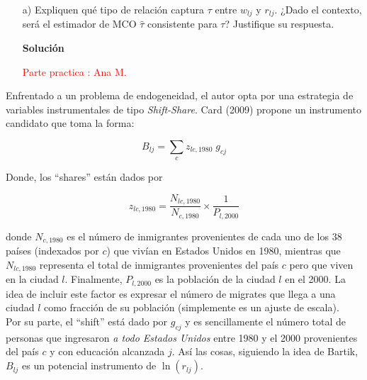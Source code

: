 \documentclass[a4paper, answers, addpoints, 11pt]{exam}
\newenvironment{solucion}{%
  \begin{mdframed}[
    backgroundcolor=blue!5,    %
    linecolor=blue!50,          %
    linewidth=2pt,              %
    leftmargin=10pt,            %
    rightmargin=8pt,           %
    topline=true,              %
    bottomline=true,            %
    roundcorner=10pt,           %
    innerleftmargin=10pt,       %
    innerrightmargin=10pt,      %
    innerbottommargin=10pt,     %
    innertopmargin=10pt         %
  ]%
  \begin{tcolorbox}[colframe=blue!50!black, colback=blue!50, coltitle=white, sharp corners=all, boxrule=1mm, width=\textwidth, halign=left, valign=center, top=0mm, bottom=0mm, left=0mm, right=0mm] \textbf{Solución} \end{tcolorbox} }{\end{mdframed}}
\begin{document}
 
\begin{itemize}

   

    \item[a)] Expliquen qué tipo de relación captura $\tau$ entre $w_{lj}$ y $r_{lj}$. ¿Dado el contexto, será el estimador de MCO $\hat{\tau}$ consistente para $\tau$? Justifique su respuesta.\\
    \begin{solucion}
    \textcolor{red}{Parte practica : Ana M.}
\end{solucion}
\end{itemize}   

Enfrentado a un problema de endogeneidad, el autor opta por una estrategia de variables instrumentales de tipo \textit{Shift-Share}. Card (2009) propone un instrumento candidato que toma la forma:

$$B_{lj}=\sum_c z_{lc,1980} \; g_{cj}$$

Donde, los ``shares'' están dados por 

$$z_{lc,1980}=\dfrac{N_{lc,1980}}{N_{c,1980}} \times \dfrac{1}{P_{l,2000}}$$

donde $N_{c,1980}$ es el número de inmigrantes provenientes de cada uno de los 38 países (indexados por $c$) que vivían en Estados Unidos en 1980, mientras que $N_{lc,1980}$ representa el total de inmigrantes provenientes del país $c$ pero que viven en la ciudad $l$. Finalmente, $P_{l,2000}$ es la población de la ciudad $l$ en el 2000. La idea de incluir este factor es expresar el número de migrates que llega a una ciudad $l$ como fracción de su población (simplemente es un ajuste de escala).\\

Por su parte, el ``shift'' está dado por $g_{cj}$ y es sencillamente el número total de personas que ingresaron \textit{a todo Estados Unidos} entre 1980 y el 2000 provenientes del país $c$ y con educación alcanzada $j$. Así las cosas, siguiendo la idea de Bartik, $B_{lj}$ es un potencial instrumento de $\ln(r_{lj})$.\\
\end{document}

